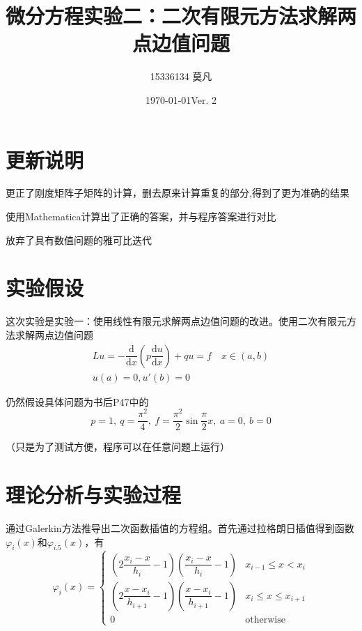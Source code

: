 \documentclass[11pt, a4paper]{article}
\begin{document}
	
\title{微分方程实验二：二次有限元方法求解两点边值问题}
\author{15336134 莫凡}
\date{\today\quad Ver. 2}
\maketitle

\setcounter{section}{-1}

\section{更新说明}

更正了刚度矩阵子矩阵的计算，删去原来计算重复的部分,得到了更为准确的结果

使用Mathematica计算出了正确的答案，并与程序答案进行对比

放弃了具有数值问题的雅可比迭代

\section{实验假设}

这次实验是实验一：使用线性有限元求解两点边值问题的改进。使用二次有限元方法求解两点边值问题
\begin{equation}
	\begin{array}{c}
	Lu=-\dfrac{\mathrm{d}}{\mathrm{d}x}\left(p\dfrac{\mathrm{d}u}{\mathrm{d}x}\right)+qu=f\quad x\in (a, b)\\
	u(a)=0,u'(b)=0
	\end{array}
\end{equation}
	
仍然假设具体问题为书后P47中的
\begin{equation}
	p=1,~q=\dfrac{\pi^2}{4},~f=\dfrac{\pi^2}{2}\sin\dfrac{\pi}{2}x,~a=0,~b=0
\end{equation}

（只是为了测试方便，程序可以在任意问题上运行）

\section{理论分析与实验过程}

通过Galerkin方法推导出二次函数插值的方程组。首先通过拉格朗日插值得到函数$\varphi_i(x)$和$\varphi_{i.5}(x)$，有
\begin{equation}
	\varphi_i(x)=\left\{
	\begin{array}{cr}
		\left(2\dfrac{x_i-x}{h_i}-1\right)\left(\dfrac{x_i-x}{h_i}-1\right) & x_{i-1}\le x<x_i\\
		\left(2\dfrac{x-x_i}{h_{i+1}}-1\right)\left(\dfrac{x-x_i}{h_{i+1}}-1\right) & x_{i}\le x\le x_{i+1}\\
		0 & \text{otherwise}
	\end{array}
	\right.
\end{equation}
\end{document}
